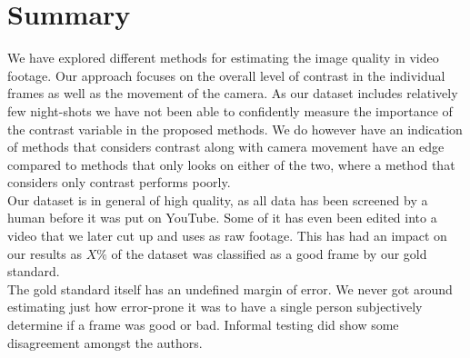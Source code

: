 \section{Summary}
%
We have explored different methods for estimating the image quality in video footage. Our approach focuses on the overall level of contrast in the individual frames as well as the movement of the camera. As our dataset includes relatively few night-shots we have not been able to confidently measure the importance of the contrast variable in the proposed methods. We do however have an indication of methods that considers contrast along with camera movement have an edge compared to methods that only looks on either of the two, where a method that considers only contrast performs poorly.\\
Our dataset is in general of high quality, as all data has been screened by a human before it was put on YouTube. Some of it has even been edited into a video that we later cut up and uses as raw footage. This has had an impact on our results as $X\%$ of the dataset was classified as a good frame by our gold standard.\\
The gold standard itself has an undefined margin of error. We never got around estimating just how error-prone it was to have a single person subjectively determine if a frame was good or bad. Informal testing did show some disagreement amongst the authors.
%